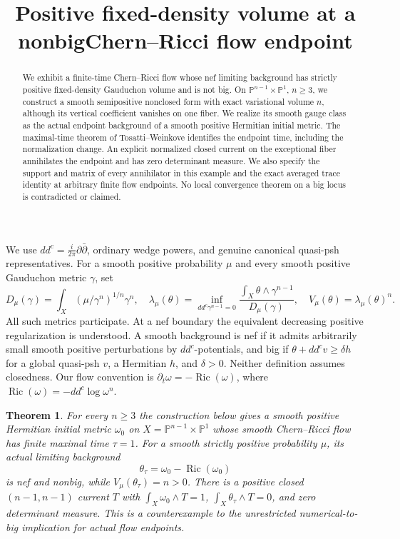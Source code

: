 \documentclass[11pt]{article}
\title{Positive fixed-density volume at a nonbig\newline Chern--Ricci flow endpoint}
\author{}
\date{}
\newcommand{\ddc}{dd^c}
\newtheorem{theorem}{Theorem}
\theoremstyle{remark}\newtheorem{remark}[theorem]{Remark}
\begin{document}
\maketitle
\begin{abstract}
We exhibit a finite-time Chern--Ricci flow whose nef limiting background
has strictly positive fixed-density Gauduchon volume and is not big.
On $\mathbb P^{n-1}\times\mathbb P^1$, $n\geq3$, we construct a smooth
semipositive nonclosed form with exact variational volume $n$, although
its vertical coefficient vanishes on one fiber. We realize its smooth
gauge class as the actual endpoint background of a smooth positive
Hermitian initial metric. The maximal-time theorem of Tosatti--Weinkove
identifies the endpoint time, including the normalization change.
An explicit normalized closed current on the exceptional fiber
annihilates the endpoint and has zero determinant measure. We also specify
the support and matrix of every annihilator in this example and the exact
averaged trace identity at arbitrary finite flow endpoints. No local
convergence theorem on a big locus is contradicted or claimed.
\end{abstract}

We use $\ddc=\frac{i}{2\pi}\partial\bar\partial$, ordinary wedge powers,
and genuine canonical quasi-psh representatives. For a smooth positive
probability $\mu$ and every smooth positive Gauduchon metric $\gamma$, set
\[
 D_\mu(\gamma)=\int_X(\mu/\gamma^n)^{1/n}\gamma^n,
 \quad \lambda_\mu(\theta)=\inf_{\ddc\gamma^{n-1}=0}
 \frac{\int_X\theta\wedge\gamma^{n-1}}{D_\mu(\gamma)},
 \quad V_\mu(\theta)=\lambda_\mu(\theta)^n.
\]
All such metrics participate. At a nef boundary the equivalent decreasing
positive regularization is understood. A smooth background is nef if it
admits arbitrarily small smooth positive perturbations by $\ddc$-potentials,
and big if $\theta+\ddc v\geq\delta h$ for a global quasi-psh $v$, a
Hermitian $h$, and $\delta>0$. Neither definition assumes closedness.
Our flow convention is $\partial_t\omega=-\operatorname{Ric}(\omega)$,
where $\operatorname{Ric}(\omega)=-\ddc\log\omega^n$.

\begin{theorem}\label{th:flow}
For every $n\geq3$ the construction below gives a smooth positive
Hermitian initial metric $\omega_0$ on $X=\mathbb P^{n-1}\times\mathbb P^1$
whose smooth Chern--Ricci flow has finite maximal time $\tau=1$.
For a smooth strictly positive probability $\mu$, its actual limiting
background
\[
 \theta_\tau=\omega_0-\operatorname{Ric}(\omega_0)
\]
is nef and nonbig, while $V_\mu(\theta_\tau)=n>0$.
There is a positive closed $(n-1,n-1)$ current $T$ with
$\int_X\omega_0\wedge T=1$, $\int_X\theta_\tau\wedge T=0$, and
zero determinant measure. This is a counterexample to the
unrestricted numerical-to-big implication for actual flow endpoints.
\end{theorem}
\end{document}
